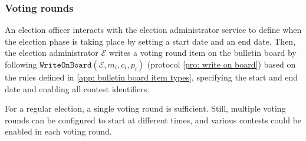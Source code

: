 \subsubsection{Voting rounds} \label{sec: voting rounds}
An election officer interacts with the election administrator service to define when the election phase is taking place by setting a start date and an end date. Then, the election administrator $\mathcal{E}$ writes a voting round item on the bulletin board by following $\mathtt{WriteOnBoard}(\mathcal{E}, m_i, c_i, p_i)$ (protocol \ref{pro: write on board}) based on the rules defined in \cref{app: bulletin board item types}, specifying the start and end date and enabling all contest identifiers.

For a regular election, a single voting round is sufficient. Still, multiple voting rounds can be configured to start at different times, and various contests could be enabled in each voting round.
